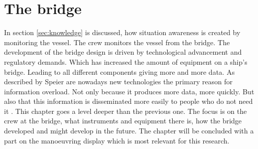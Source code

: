 \chapter{The bridge}
In section \ref{sec:knowledge} is discussed, how situation awareness is created by monitoring the vessel. The crew monitors the vessel from the bridge. The development of the bridge design is driven by technological advancement and regulatory demands. Which has increased the amount of equipment on a ship's bridge. Leading to all different components giving more and more data. As described by Speier are nowadays new technologies the primary reason for information overload. Not only because it produces more data, more quickly. But also that this information is disseminated more easily to people who do not need it \cite{Speier1999}. 
This chapter goes a level deeper than the previous one. The focus is on the crew at the bridge, what instruments and equipment there is, how the bridge developed and might develop in the future. The chapter will be concluded with a part on the manoeuvring display which is most relevant for this research. 


